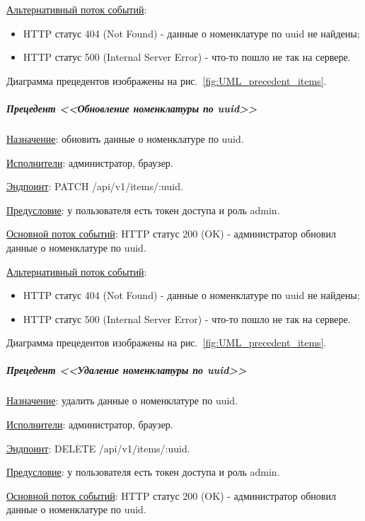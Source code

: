 \underline{Альтернативный поток событий}:

\begin{itemize}
    \item HTTP статус 404 (Not Found) - данные о номенклатуре по uuid не найдены;
    \item HTTP статус 500 (Internal Server Error) - что-то пошло не так на сервере.
\end{itemize}

Диаграмма прецедентов изображены на рис.~\ref{fig:UML_precedent_items}.


\subparagraph{Прецедент <<Обновление номенклатуры по uuid>>} \hspace{0pt}

\underline{Назначение}: обновить данные о номенклатуре по uuid.

\underline{Исполнители}: администратор, браузер.

\underline{Эндпоинт}: PATCH /api/v1/items/:uuid.

\underline{Предусловие}: у пользователя есть токен доступа и роль admin.

\underline{Основной поток событий}: HTTP статус 200 (OK) - администратор обновил данные о номенклатуре по uuid. 

\underline{Альтернативный поток событий}:

\begin{itemize}
    \item HTTP статус 404 (Not Found) - данные о номенклатуре по uuid не найдены;
    \item HTTP статус 500 (Internal Server Error) - что-то пошло не так на сервере.
\end{itemize}

Диаграмма прецедентов изображены на рис.~\ref{fig:UML_precedent_items}.


\subparagraph{Прецедент <<Удаление номенклатуры по uuid>>} \hspace{0pt}

\underline{Назначение}: удалить данные о номенклатуре по uuid.

\underline{Исполнители}: администратор, браузер.

\underline{Эндпоинт}: DELETE /api/v1/items/:uuid.

\underline{Предусловие}: у пользователя есть токен доступа и роль admin.

\underline{Основной поток событий}: HTTP статус 200 (OK) - администратор обновил данные о номенклатуре по uuid. 

